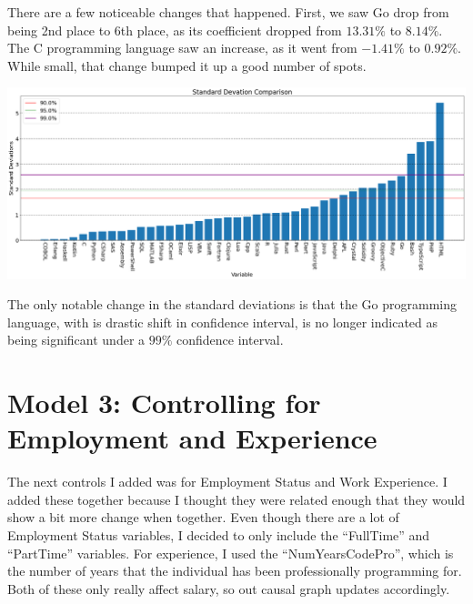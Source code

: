 \documentclass{report}
\begin{document}
There are a few noticeable changes that happened. First, we saw Go drop from being 2nd place to 6th place, as its coefficient dropped from $13.31\%$ to $8.14\%$. The C programming language saw an increase, as it went from $-1.41\%$ to $0.92\%$. While small, that change bumped it up a good number of spots.


\vspace{0.5in}

\includegraphics[width=0.9\linewidth]{model2confidencelanguages.png}

\vspace{0.5in}

The only notable change in the standard deviations is that the Go programming language, with is drastic shift in confidence interval, is no longer indicated as being significant under a $99\%$ confidence interval.

\newpage
\section{Model 3: Controlling for Employment and Experience}

The next controls I added was for Employment Status and Work Experience. I added these together because I thought they were related enough that they would show a bit more change when together. Even though there are a lot of Employment Status variables, I decided to only include the ``FullTime'' and ``PartTime'' variables. For experience, I used the ``NumYearsCodePro'', which is the number of years that the individual has been professionally programming for. Both of these only really affect salary, so out causal graph updates accordingly.
\end{document}
